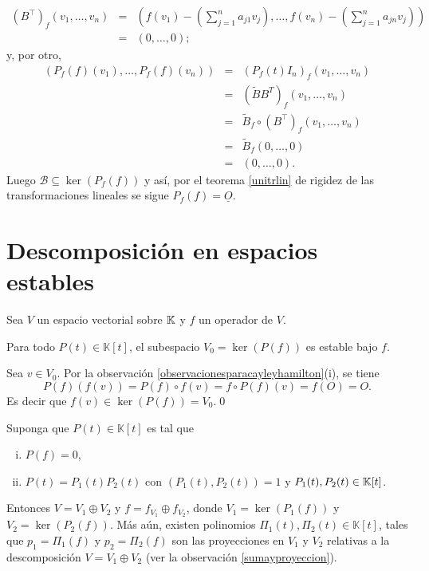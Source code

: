 \begin{obs}
\begin{eqnarray*}
\left(B^\intercal\right)_f(v_1,\ldots, v_n)& = & \left(f(v_1)-\left(\sum_{j=1}^na_{j1}v_j\right),\ldots, f(v_n)-\left(\sum_{j=1}^na_{jn}v_j\right)\right)\\
   & = & \left(0,\ldots, 0\right);
\end{eqnarray*}
y, por otro,
\begin{eqnarray*}
\left(P_f(f)(v_1),\ldots, P_f(f)(v_n)\right) & = & \left(P_f(t)I_n\right)_f(v_1,\ldots,v_n)\\
    & = & \left( \tilde{B}B^T \right)_f (v_1,\ldots, v_n)\\
    & = & \tilde{B}_f\circ\left(B^\intercal\right)_f(v_1,\ldots,v_n)\\
    & = & \tilde{B}_f(0,\ldots, 0)\\
    & = & (0,\ldots, 0).
\end{eqnarray*}
Luego $\mathcal{B}\subseteq \ker\left(P_f(f)\right)$ y as\'i, por el teorema \ref{unitrlin} de rigidez de las transformaciones lineales se sigue $P_f(f)=\underline{O}$.
\end{obs}

\section{Descomposición en espacios estables}

Sea $V$ un espacio vectorial sobre $\mathbb{K}$ y $f$ un operador de $V$.

\begin{prop}
Para todo $P(t)\in \mathbb{K}[t]$, el subespacio $V_0=\ker\left(P(f)\right)$ es estable bajo $f$.
\end{prop}

\dem Sea $v\in V_0$. Por la observación \ref{observacionesparacayleyhamilton}(i), se tiene
$$P(f)\left(f(v)\right)=P(f)\circ f(v)=f\circ P(f)(v)=f(O)=O.$$
Es decir que $f(v)\in\ker\left(P(f)\right)=V_0$.\qed

\begin{prop}
Suponga que $P(t)\in \mathbb{K}[t]$ es tal que
\begin{enumerate}[(i)]
  \item $P(f)=0$,
  \item $P(t)=P_1(t)P_2(t)$ con $\left(P_1(t),P_2(t)\right)=1$ y $P_1(t),P_2(t)\in\mathbb{K}[t]$.
\end{enumerate}
Entonces $V=V_1\oplus V_2$ y $f=f_{V_1}\oplus f_{V_2}$, donde $V_1=\ker\left(P_1(f)\right)$ y $V_2=\ker\left(P_2(f)\right)$. M\'as a\'un, existen polinomios $\Pi_1(t),\Pi_2(t)\in \mathbb{K}[t]$, tales que $p_1=\Pi_1(f)$ y $p_2=\Pi_2(f)$ son las proyecciones en $V_1$ y $V_2$ relativas a la descomposición $V=V_1\oplus V_2$ (ver la observación \ref{sumayproyeccion}).
\end{prop}

